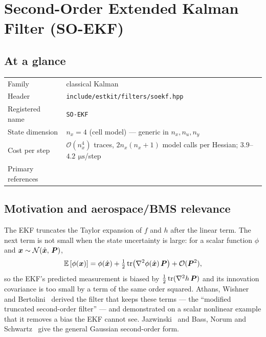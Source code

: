 \chapter{Second-Order Extended Kalman Filter (SO-EKF)}
\label{ch:soekf}

\section*{At a glance}
\begin{tabular}{@{}l>{\raggedright\arraybackslash}p{}@{}}
Family & classical Kalman \\
Header & \texttt{include/estkit/filters/soekf.hpp} \\
Registered name & \texttt{SO-EKF} \\
State dimension & $n_x = 4$ (cell model) --- generic in $n_x, n_u, n_y$ \\
Cost per step & $\mathcal{O}(n_x^4)$ traces, $2n_x(n_x{+}1)$ model calls per Hessian; $3.9$--$4.2\,\SI{}{\micro\second}$/step \\
Primary references & \cite{athans1968,jazwinski1970,bass1966,maybeck1982vol2,gelb1974} \\
\end{tabular}

\section{Motivation and aerospace/BMS relevance}
The EKF truncates the Taylor expansion of $f$ and $h$ after the linear term. The next term is
not small when the state uncertainty is large: for a scalar function $\phi$ and
$\bm{x}\sim\mathcal{N}\!\left(\hat{\bm{x}},\,\bm{P}\right)$,
\begin{equation}
\mathbb{E}\left[\phi(\bm{x})\right] = \phi(\hat{\bm{x}}) + \tfrac12\operatorname{tr}\!\left(\nabla^2\phi(\hat{\bm{x}})\,\bm{P}\right) + \mathcal{O}(\bm{P}^2),
\label{eq:soekf-motivation}
\end{equation}
so the EKF's predicted measurement is biased by $\tfrac12\operatorname{tr}(\nabla^2h\,\bm{P})$ and its
innovation covariance is too small by a term of the same order squared. Athans, Wishner and
Bertolini~\cite{athans1968} derived the filter that keeps these terms --- the ``modified
truncated second-order filter'' --- and demonstrated on a scalar nonlinear example that it
removes a bias the EKF cannot see. Jazwinski~\cite[Ch.~9]{jazwinski1970} and
Bass, Norum and Schwartz~\cite{bass1966} give the general Gaussian second-order form.


